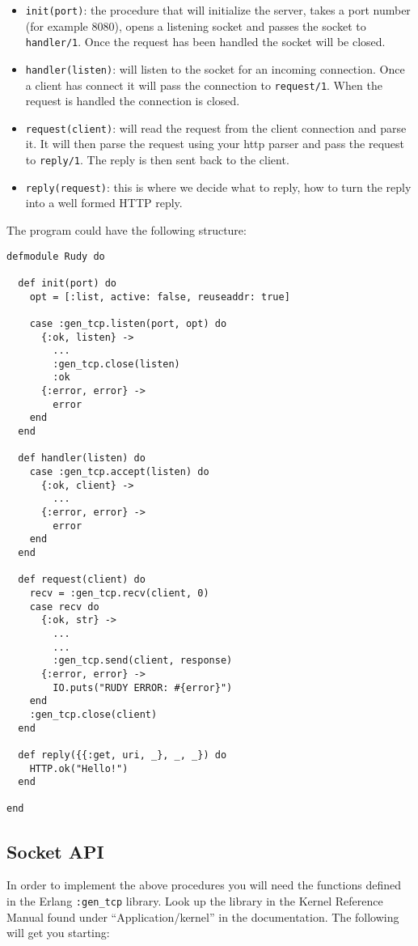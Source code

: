 \documentclass[a4paper,11pt]{article}
\begin{document}
\begin{itemize}
\item {\tt init(port)}: the procedure that will initialize the server, takes a
port number (for example 8080), opens a listening socket and passes the
socket to {\tt handler/1}. Once the request has been handled the socket
will be closed.

\item {\tt handler(listen)}: will listen to the socket for an incoming
connection. Once a client has connect it will pass the connection to
{\tt request/1}. When the request is handled the connection is closed.

\item {\tt request(client)}: will read the request from the client
connection and parse it. It will then parse the request using your
http parser and pass the request to {\tt reply/1}. The reply is then
sent back to the client.

\item {\tt reply(request)}: this is where we decide what to
reply, how to turn the reply into a well formed HTTP reply.
\end{itemize}

The program could have the following structure:

\begin{verbatim}
defmodule Rudy do

  def init(port) do
    opt = [:list, active: false, reuseaddr: true]

    case :gen_tcp.listen(port, opt) do
      {:ok, listen} ->
        ...
        :gen_tcp.close(listen)
        :ok
      {:error, error} ->
        error
    end
  end

  def handler(listen) do
    case :gen_tcp.accept(listen) do
      {:ok, client} ->
        ...
      {:error, error} ->
        error
    end
  end

  def request(client) do
    recv = :gen_tcp.recv(client, 0)
    case recv do
      {:ok, str} ->
        ...
        ...
        :gen_tcp.send(client, response)
      {:error, error} ->
        IO.puts("RUDY ERROR: #{error}")
    end
    :gen_tcp.close(client)
  end

  def reply({{:get, uri, _}, _, _}) do
    HTTP.ok("Hello!")
  end

end
\end{verbatim}

\subsection{Socket API}
In order to implement the above procedures you will need the functions
defined in the Erlang {\tt :gen\_tcp} library. Look up the library in the
Kernel Reference Manual found under ``Application/kernel'' in the
documentation. The following will get you starting:
\end{document}
